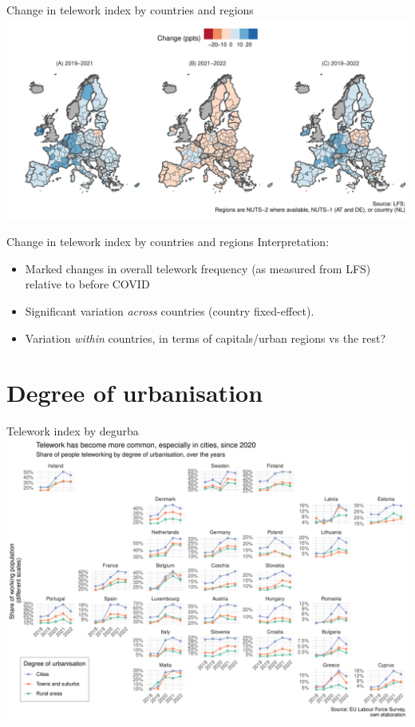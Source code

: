 \documentclass[10pt]{beamer}
\begin{document}
\begin{frame}{Change in telework index by countries and regions}
\centering
\includegraphics[width=\textwidth,height=0.9\textheight,keepaspectratio]{Telework_nuts_change.pdf}
\end{frame}

\begin{frame}{Change in telework index by countries and regions}
Interpretation:
\begin{itemize}
\item Marked changes in overall telework frequency (as measured from LFS) relative to before COVID
\item Significant variation \emph{across} countries (country fixed-effect).
\item Variation \emph{within} countries, in terms of capitals/urban regions vs the rest?
 \end{itemize}
\end{frame}

\section{Degree of urbanisation}
\begin{frame}{Telework index by degurba}
\pause
\centering
\includegraphics[width=\textwidth,height=0.9\textheight,keepaspectratio]{Telework_degurba_eu.pdf}
\end{frame}
\end{document}
